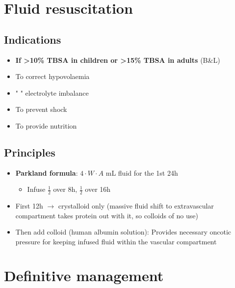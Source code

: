\documentclass[
  12pt,
]{memoir}
\providecommand{\tightlist}{%
  \setlength{\itemsep}{0pt}\setlength{\parskip}{0pt}}
\begin{document}
\hypertarget{fluid-resuscitation}{%
\section{Fluid resuscitation}\label{fluid-resuscitation}}

\hypertarget{indications-1}{%
\subsection{Indications}\label{indications-1}}

\begin{itemize}
\tightlist
\item
  \textbf{If \textgreater10\% TBSA in children or \textgreater15\% TBSA
  in adults} (B\&L)
\item
  To correct hypovolaemia
\item
  " " electrolyte imbalance
\item
  To prevent shock
\item
  To provide nutrition
\end{itemize}

\pagebreak

\hypertarget{principles}{%
\subsection{Principles}\label{principles}}

\begin{itemize}
\tightlist
\item
  \textbf{Parkland formula}: \(4\cdot W \cdot A\) mL fluid for the 1st
  24h

  \begin{itemize}
  \tightlist
  \item
    Infuse \(\frac{1}{2}\) over 8h, \(\frac{1}{2}\) over 16h
  \end{itemize}
\item
  First 12h \(\rightarrow\) crystalloid only (massive fluid shift to
  extravascular compartment takes protein out with it, so colloids of no
  use)
\item
  Then add colloid (human albumin solution): Provides necessary oncotic
  pressure for keeping infused fluid within the vascular compartment
\end{itemize}

\hypertarget{definitive-management}{%
\section{Definitive management}\label{definitive-management}}
\end{document}
